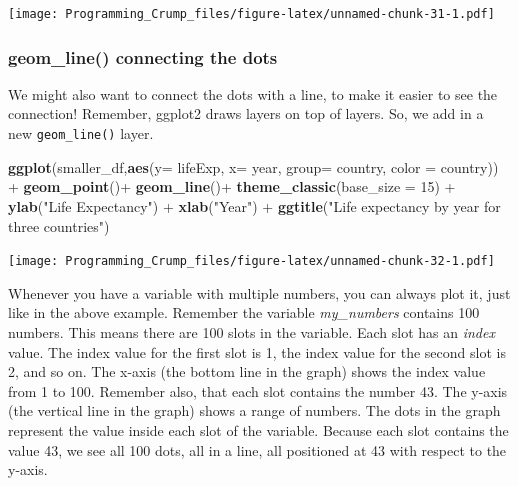 \documentclass[]{book}
\newenvironment{Shaded}{\begin{snugshade}}{\end{snugshade}}
\newcommand{\KeywordTok}[1]{\textcolor[rgb]{0.13,0.29,0.53}{\textbf{{#1}}}}
\newcommand{\DataTypeTok}[1]{\textcolor[rgb]{0.13,0.29,0.53}{{#1}}}
\newcommand{\DecValTok}[1]{\textcolor[rgb]{0.00,0.00,0.81}{{#1}}}
\newcommand{\StringTok}[1]{\textcolor[rgb]{0.31,0.60,0.02}{{#1}}}
\newcommand{\NormalTok}[1]{{#1}}
\theoremstyle{definition}
\theoremstyle{definition}
\theoremstyle{definition}
\theoremstyle{remark}
\begin{document}
\texttt{[image: Programming\_Crump\_files/figure-latex/unnamed-chunk-31-1.pdf]}

\subsubsection{geom\_line() connecting the
dots}\label{geom_line-connecting-the-dots}

We might also want to connect the dots with a line, to make it easier to
see the connection! Remember, ggplot2 draws layers on top of layers. So,
we add in a new \texttt{geom\_line()} layer.

\begin{Shaded}
\begin{Highlighting}[]
\KeywordTok{ggplot}\NormalTok{(smaller_df,}\KeywordTok{aes}\NormalTok{(}\DataTypeTok{y=} \NormalTok{lifeExp, }\DataTypeTok{x=} \NormalTok{year, }
                      \DataTypeTok{group=} \NormalTok{country, }\DataTypeTok{color =} \NormalTok{country)) +}
\StringTok{  }\KeywordTok{geom_point}\NormalTok{()+}\StringTok{ }
\StringTok{  }\KeywordTok{geom_line}\NormalTok{()+}
\StringTok{  }\KeywordTok{theme_classic}\NormalTok{(}\DataTypeTok{base_size =} \DecValTok{15}\NormalTok{) +}
\StringTok{  }\KeywordTok{ylab}\NormalTok{(}\StringTok{"Life Expectancy"}\NormalTok{) +}\StringTok{ }
\StringTok{  }\KeywordTok{xlab}\NormalTok{(}\StringTok{"Year"}\NormalTok{) +}
\StringTok{  }\KeywordTok{ggtitle}\NormalTok{(}\StringTok{"Life expectancy by year for three countries"}\NormalTok{)}
\end{Highlighting}
\end{Shaded}

\texttt{[image: Programming\_Crump\_files/figure-latex/unnamed-chunk-32-1.pdf]}

Whenever you have a variable with multiple numbers, you can always plot
it, just like in the above example. Remember the variable
\emph{my\_numbers} contains 100 numbers. This means there are 100 slots
in the variable. Each slot has an \emph{index} value. The index value
for the first slot is 1, the index value for the second slot is 2, and
so on. The x-axis (the bottom line in the graph) shows the index value
from 1 to 100. Remember also, that each slot contains the number 43. The
y-axis (the vertical line in the graph) shows a range of numbers. The
dots in the graph represent the value inside each slot of the variable.
Because each slot contains the value 43, we see all 100 dots, all in a
line, all positioned at 43 with respect to the y-axis.
\end{document}

